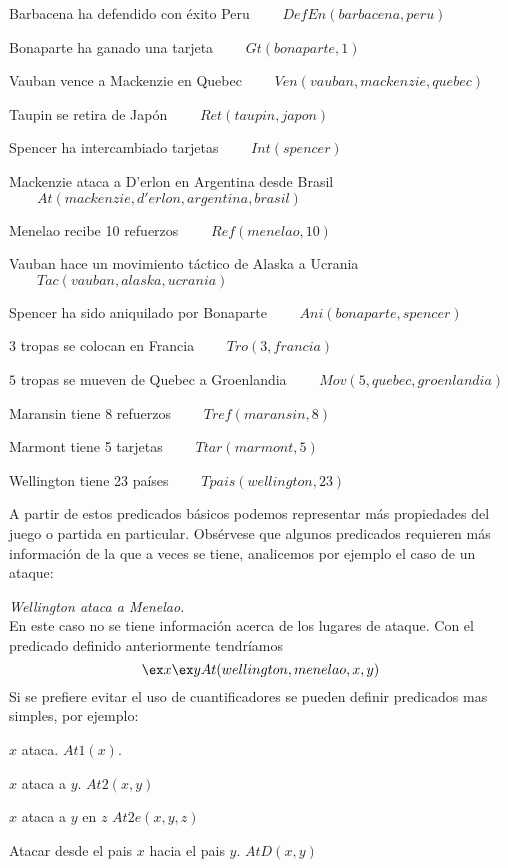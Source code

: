 \documentclass[11pt,letterpaper]{article}
\begin{document}
 \item Barbacena ha defendido con éxito Peru  $\qquad  DefEn(barbacena,peru)$

 \item Bonaparte ha ganado una tarjeta $\qquad  Gt(bonaparte,1)$

 \item Vauban vence a Mackenzie en Quebec  
    $\qquad Ven(vauban,mackenzie,quebec)$

 \item Taupin se retira de Japón  $\qquad   Ret(taupin,japon)$

 \item Spencer ha intercambiado tarjetas $\qquad  Int(spencer)$

 \item Mackenzie ataca a D'erlon en Argentina desde Brasil 
    $\qquad At(mackenzie,d'erlon,argentina,brasil)$

 \item Menelao recibe 10 refuerzos  $\qquad  Ref(menelao,10)$

 \item Vauban hace un movimiento táctico de Alaska a Ucrania 
    $\qquad Tac(vauban,alaska,ucrania)$

 \item Spencer ha sido aniquilado por Bonaparte  $\qquad Ani(bonaparte,spencer)$

 \item $3$ tropas se colocan en Francia $\qquad Tro(3,francia)$

 \item $5$ tropas se mueven de Quebec a Groenlandia 
    $\qquad Mov(5,quebec,groenlandia)$
                 
 \item Maransin tiene 8 refuerzos $\qquad Tref(maransin,8)$
 
 \item Marmont tiene 5 tarjetas $\qquad Ttar(marmont,5)$
 
 \item Wellington tiene 23 pa\'ises $\qquad Tpais(wellington,23)$
\ei

\newpage

A partir de estos predicados básicos podemos representar más propiedades del 
juego o partida en particular.
Obsérvese que algunos predicados requieren más información de la que a veces se 
tiene, analicemos por ejemplo el caso de un ataque:
\bi
\item \textit{Wellington ataca a Menelao.}\\ En este caso no se tiene
  información acerca de los lugares de ataque. Con el predicado
  definido anteriormente tendr\'iamos 
  \[
  \ex x\ex y At(wellington,menelao,x,y)
  \]
Si se prefiere evitar el uso de cuantificadores se pueden definir predicados 
mas simples, por ejemplo:
\bi
 \item $x$ ataca.  $At1(x)$.
 \item $x$ ataca a $y$.  $At2(x,y)$
 \item $x$ ataca a $y$ en $z$ $At2e(x,y,z)$
 \item Atacar desde el pais $x$ hacia el pais $y$.  $AtD(x,y)$
\ei
\end{document}

